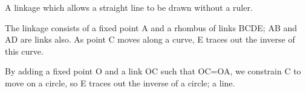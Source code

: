 A linkage which allows a straight line to be drawn without a ruler.
\par
The linkage consists of a fixed point A and a rhombus of links
BCDE; AB and AD are links also. As point C moves along a curve, E traces
out the inverse of this curve.
\par
By adding a fixed point O and a link OC such that OC=OA, we constrain
C to move on a circle, so E traces out the inverse of a circle; a line.
